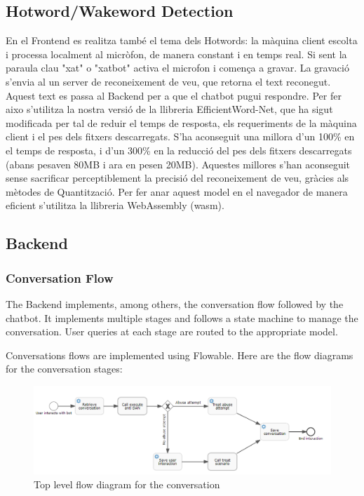 \documentclass[a4paper,12pt,twoside]{ThesisStyle}
\begin{document}
\subsection{Hotword/Wakeword Detection}
En el Frontend es realitza també el tema dels Hotwords: la màquina client escolta i processa localment al micròfon, de manera constant i en temps real. Si sent la paraula clau "xat" o "xatbot" activa el microfon i comença a gravar. La gravació s'envia al un server de reconeixement de veu, que retorna el text reconegut. Aquest text es passa al Backend per a que el chatbot pugui respondre. Per fer aixo s'utilitza la nostra versió de la llibreria EfficientWord-Net, que ha sigut modificada per tal de reduir el temps de resposta, els requeriments de la màquina client i el pes dels fitxers descarregats. S'ha aconseguit una millora d'un 100\% en el temps de resposta, i d'un 300\% en la reducció del pes dels fitxers descarregats (abans pesaven 80MB i ara en pesen 20MB). Aquestes millores s'han aconseguit sense sacrificar perceptiblement la precisió del reconeixement de veu, gràcies als mètodes de Quantització. Per fer anar aquest model en el navegador de manera eficient s'utilitza la llibreria WebAssembly (wasm).

\subsection{Backend}

\subsubsection{Conversation Flow}

The Backend implements, among others, the conversation flow followed by the chatbot. It implements multiple stages and follows a state machine to manage the conversation. User queries at each stage are routed to the appropriate model.

Conversations flows are implemented using Flowable. Here are the flow diagrams for the conversation stages:


\begin{figure}[htb]
  \label{fig:conversation}
  \centering
  \includegraphics[width=1\textwidth]{imatges/0_DsoConversation.png}
  \caption{Top level flow diagram for the conversation}
\end{figure}
\end{document}
